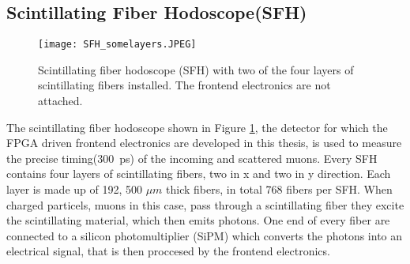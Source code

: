 \subsection{Scintillating Fiber Hodoscope(SFH)}
\begin{figure}[H]
	\centering
	\texttt{[image: SFH\_somelayers.JPEG]}
	\caption{Scintillating fiber hodoscope (SFH) with two of the four layers of scintillating fibers installed. The frontend electronics are not attached.\autocite{InternalcommunicationKarl}}
	\label{SFHpicture}
\end{figure}
The scintillating fiber hodoscope shown in Figure \ref{SFHpicture}, 
the detector for which the FPGA driven frontend electronics are developed in this thesis,
is used to measure the precise timing(\SI{300}{\pico\second}\Autocite{Amber2022Status}) of the incoming and scattered muons. 
Every SFH contains four layers of scintillating fibers, two in x and two in y direction.
Each layer is made up of 192\autocite{Amber2022Status}, 500 $\mu m$ thick\autocite{Amber2024Status} fibers, in total 768\autocite{Amber2022Status} fibers per SFH. 
When charged particels, muons in this case, pass through a scintillating fiber they excite the scintillating material, 
which then emits photons. One end of every fiber are connected to a silicon photomultiplier (SiPM) which converts the photons into an electrical signal,
that is then proccesed by the frontend electronics.\autocite{InternalcommunicationKarl}


